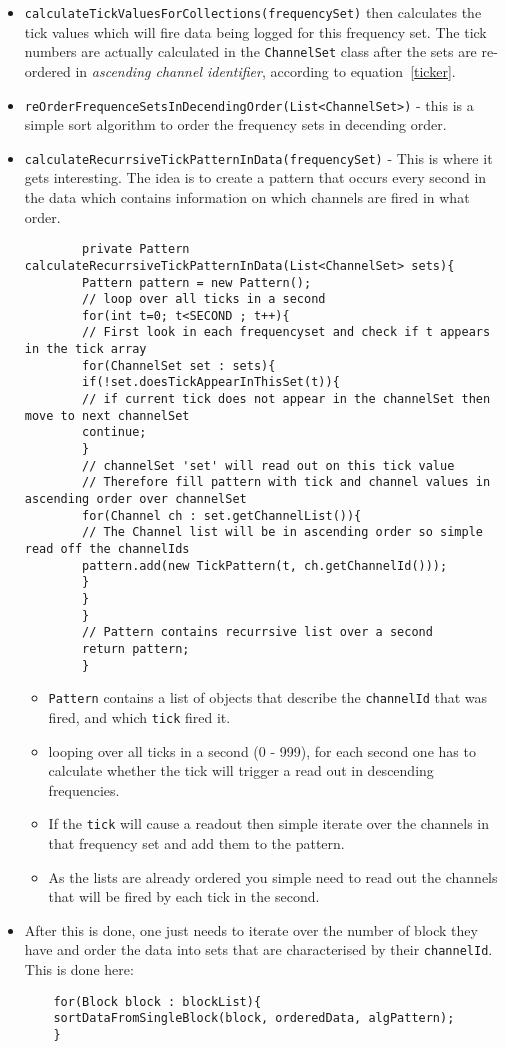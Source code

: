 \documentclass{article}
\begin{document}
\begin{itemize}
		\item \texttt{calculateTickValuesForCollections(frequencySet)} then calculates the tick values which will fire data being logged for this frequency set. The tick numbers are actually calculated in the \texttt{ChannelSet} class after the sets are re-ordered in \emph{ascending channel identifier}, according to equation~\ref{ticker}.
		\item \texttt{reOrderFrequenceSetsInDecendingOrder(List<ChannelSet>)} - this is a simple sort algorithm to order the frequency sets in decending order.
		\item \texttt{calculateRecurrsiveTickPatternInData(frequencySet)} - This is where it gets interesting. The idea is to create a pattern that occurs every second in the data which contains information on which channels are fired in what order.
		\begin{lstlisting}
		private Pattern calculateRecurrsiveTickPatternInData(List<ChannelSet> sets){
		Pattern pattern = new Pattern();
		// loop over all ticks in a second
		for(int t=0; t<SECOND ; t++){
		// First look in each frequencyset and check if t appears in the tick array
		for(ChannelSet set : sets){
		if(!set.doesTickAppearInThisSet(t)){
		// if current tick does not appear in the channelSet then move to next channelSet
		continue;
		}
		// channelSet 'set' will read out on this tick value
		// Therefore fill pattern with tick and channel values in ascending order over channelSet
		for(Channel ch : set.getChannelList()){
		// The Channel list will be in ascending order so simple read off the channelIds
		pattern.add(new TickPattern(t, ch.getChannelId()));
		}
		}
		}
		// Pattern contains recurrsive list over a second
		return pattern;
		}
		\end{lstlisting}
		\begin{itemize}
			\item \texttt{Pattern} contains a list of objects that describe the \texttt{channelId} that was fired, and which \texttt{tick} fired it.
			\item looping over all ticks in a second (0 - 999), for each second one has to calculate whether the tick will trigger a read out in descending frequencies. 
			\item If the \texttt{tick} will cause a readout then simple iterate over the channels in that frequency set and add them to the pattern.
			\item As the lists are already ordered you simple need to read out the channels that will be fired by each tick in the second.
		\end{itemize}
	\item After this is done, one just needs to iterate over the number of block they have and order the data into sets that are characterised by their \texttt{channelId}. This is done here:
	\begin{lstlisting}
	for(Block block : blockList){
	sortDataFromSingleBlock(block, orderedData, algPattern);
	}
	

\end{lstlisting}
\end{itemize}
\end{document}
